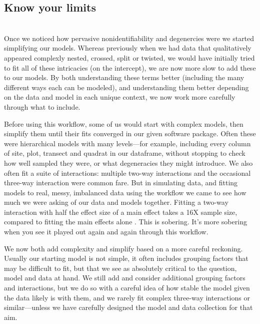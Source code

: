 \documentclass[11pt]{article}
\begin{document}
 \subsection*{Know your limits} \\ %
Once we noticed how pervasive nonidentifiability and degenercies were we started simplifying our models. Whereas previously when we had data that qualitatively appeared complexly nested, crossed, split or twisted, we would have initially tried to fit all of these intricacies (on the intercept), we are now more slow to add these to our models. By both understanding these terms better (including the many different ways each can be modeled), and understanding them better depending on the data and model in each unique context, we now work more carefully through what to include. 

Before using this workflow, some of us would start with complex models, then simplify them until their fits converged in our given software package. Often these were hierarchical models with many levels---for example, including every column of site, plot, transect and quadrat in our dataframe, without stopping to check how well sampled they were, or what degeneracies they might introduce. %
We also often fit a suite of interactions: multiple two-way interactions and the occasional three-way interaction were common fare. But in simulating data, and fitting models to real, messy, imbalanced data using the workflow we came to see how much we were asking of our data and models together. Fitting a two-way interaction with half the effect size of a main effect takes a 16X sample size, compared to fitting the main effects alone \citep[the main effects then average over the interactions, see][for more details]{regotherstories}. This is sobering. It's more sobering when you see it played out again and again through this workflow. 

We now both add complexity and simplify based on a more careful reckoning. Usually our starting model is not simple, it often includes grouping factors that may be difficult to fit, but that we see as absolutely critical to the question, model and data at hand. We still add and consider additional grouping factors and interactions, but we do so with a careful idea of how stable the model given the data likely is with them, and we rarely fit complex three-way interactions or similar---unless we have carefully designed the model and data collection for that aim. %
\end{document}
